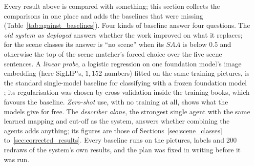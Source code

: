 Every result above is compared with something; this section collects the comparisons in one place and adds the baselines that were missing (Table~\ref{tab:against_baselines}). Four kinds of baseline answer four questions. The \emph{old system as deployed} answers whether the work improved on what it replaces; for the scene classes its answer is ``no scene'' when its $SAA$ is below $0.5$ and otherwise the top of the scene matcher's forced choice over the five scene sentences. A \emph{linear probe}, a logistic regression on one foundation model's image embedding (here SigLIP's, $1{,}152$ numbers) fitted on the same training pictures, is the standard single-model baseline for classifying with a frozen foundation model \cite{clip2021}; its regularisation was chosen by cross-validation inside the training books, which favours the baseline. \emph{Zero-shot} use, with no training at all, shows what the models give for free. The \emph{describer alone}, the strongest single agent with the same learned mapping and cut-off as the system, answers whether combining the agents adds anything; its figures are those of Sections~\ref{sec:scene_classes} to~\ref{sec:corrected_results}. Every baseline runs on the pictures, labels and 200 redraws of the system's own results, and the plan was fixed in writing before it was run.

